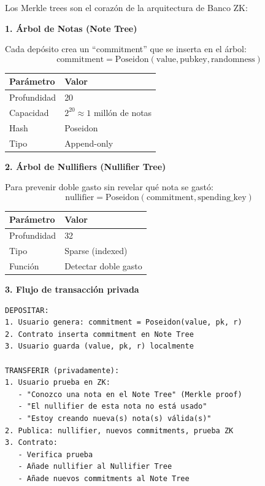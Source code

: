 \documentclass[11pt,a4paper,twoside,openright]{book}
\theoremstyle{definition}
\theoremstyle{plain}
\theoremstyle{remark}
\begin{document}
\begin{bancozk}
Los Merkle trees son el corazón de la arquitectura de Banco ZK:

\textbf{1. Árbol de Notas (Note Tree)}

Cada depósito crea un ``commitment'' que se inserta en el árbol:
\[ \text{commitment} = \text{Poseidon}(\text{value}, \text{pubkey}, \text{randomness}) \]

\begin{center}
\begin{tabular}{ll}
\toprule
\textbf{Parámetro} & \textbf{Valor} \\
\midrule
Profundidad & 20 \\
Capacidad & $2^{20} \approx 1$ millón de notas \\
Hash & Poseidon \\
Tipo & Append-only \\
\bottomrule
\end{tabular}
\end{center}

\textbf{2. Árbol de Nullifiers (Nullifier Tree)}

Para prevenir doble gasto sin revelar qué nota se gastó:
\[ \text{nullifier} = \text{Poseidon}(\text{commitment}, \text{spending\_key}) \]

\begin{center}
\begin{tabular}{ll}
\toprule
\textbf{Parámetro} & \textbf{Valor} \\
\midrule
Profundidad & 32 \\
Tipo & Sparse (indexed) \\
Función & Detectar doble gasto \\
\bottomrule
\end{tabular}
\end{center}

\textbf{3. Flujo de transacción privada}

\begin{verbatim}
DEPOSITAR:
1. Usuario genera: commitment = Poseidon(value, pk, r)
2. Contrato inserta commitment en Note Tree
3. Usuario guarda (value, pk, r) localmente

TRANSFERIR (privadamente):
1. Usuario prueba en ZK:
   - "Conozco una nota en el Note Tree" (Merkle proof)
   - "El nullifier de esta nota no está usado"
   - "Estoy creando nueva(s) nota(s) válida(s)"
2. Publica: nullifier, nuevos commitments, prueba ZK
3. Contrato:
   - Verifica prueba
   - Añade nullifier al Nullifier Tree
   - Añade nuevos commitments al Note Tree


\end{verbatim}
\end{bancozk}
\end{document}
